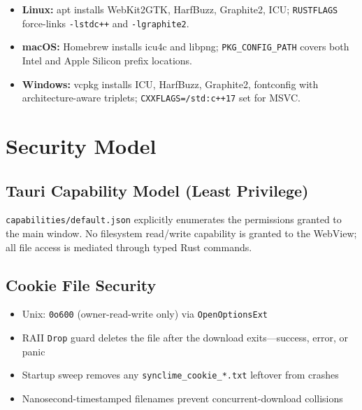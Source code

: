 \documentclass[10pt,letterpaper]{article}
\begin{document}
\begin{itemize}[leftmargin=1.6em, itemsep=2pt]
  \item \textbf{Linux:} apt installs WebKit2GTK, HarfBuzz, Graphite2, ICU; \texttt{RUSTFLAGS}
        force-links \texttt{-lstdc++} and \texttt{-lgraphite2}.
  \item \textbf{macOS:} Homebrew installs icu4c and libpng; \texttt{PKG\_CONFIG\_PATH}
        covers both Intel and Apple Silicon prefix locations.
  \item \textbf{Windows:} vcpkg installs ICU, HarfBuzz, Graphite2, fontconfig with
        architecture-aware triplets; \texttt{CXXFLAGS=/std:c++17} set for MSVC.
\end{itemize}

\section{Security Model}

\subsection{Tauri Capability Model (Least Privilege)}

\texttt{capabilities/default.json} explicitly enumerates the permissions granted to the
main window. No filesystem read/write capability is granted to the WebView; all file
access is mediated through typed Rust commands.

\subsection{Cookie File Security}

\begin{itemize}[leftmargin=1.6em, itemsep=2pt]
  \item Unix: \texttt{0o600} (owner-read-write only) via \texttt{OpenOptionsExt}
  \item RAII \texttt{Drop} guard deletes the file after the download exits---success, error, or panic
  \item Startup sweep removes any \texttt{synclime\_cookie\_*.txt} leftover from crashes
  \item Nanosecond-timestamped filenames prevent concurrent-download collisions
\end{itemize}
\end{document}
